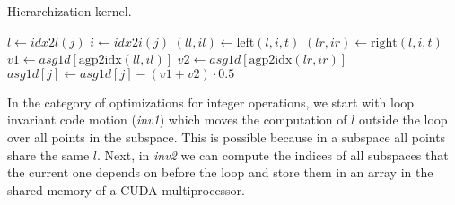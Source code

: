 \begin{algorithm}[tbp]
\small{
 \caption{Hierarchization kernel.}
 \label{alg:hierarchization_kernel}                       
 \begin{algorithmic}[1]
 			\STATE $l \leftarrow idx2l(j)$
 		\ENDIF
 		\STATE $i \leftarrow idx2i(j)$
 		\STATE $(\textit{ll}, \textit{il}) \leftarrow \text{left}(l, i, t)$
 		\STATE $(\textit{lr}, \textit{ir}) \leftarrow \text{right}(l, i, t)$
 		\STATE $\textit{v1} \leftarrow \textit{asg1d}[\text{agp2idx}(\textit{ll}, \textit{il})]$
 		\STATE $\textit{v2} \leftarrow \textit{asg1d}[\text{agp2idx}(\textit{lr}, \textit{ir})]$
 		\STATE $\textit{asg1d}[j] \leftarrow \textit{asg1d}[j] - (\textit{v1} + \textit{v2}) \cdot 0.5$
	\ENDFOR
 \end{algorithmic}
}
\end{algorithm}


In the category of optimizations for integer operations, we start with loop
invariant code motion (\textit{inv1}) which moves the computation of $l$ outside
the loop over all points in the subspace. This is possible because in a subspace
all points share the same $l$. Next, in \textit{inv2} we can compute the indices
of all subspaces that the current one depends on before the loop and store them
in an array in the shared memory of a CUDA multiprocessor.



